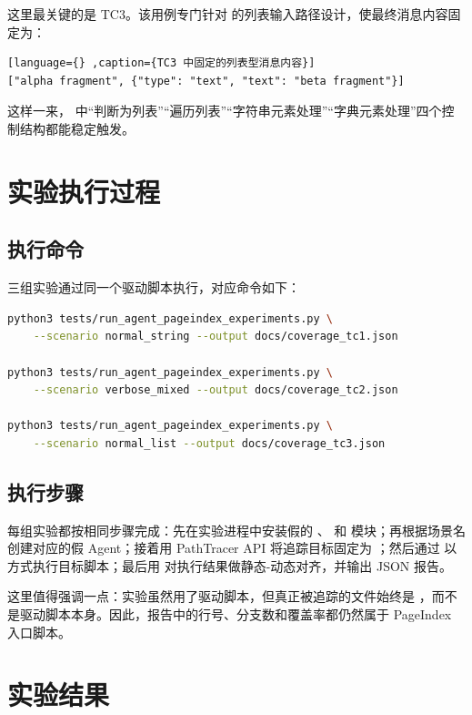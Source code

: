 这里最关键的是 TC3。该用例专门针对  的列表输入路径设计，使最终消息内容固定为：

\begin{lstlisting}[language={} ,caption={TC3 中固定的列表型消息内容}]
["alpha fragment", {"type": "text", "text": "beta fragment"}]
\end{lstlisting}

这样一来， 中“判断为列表”“遍历列表”“字符串元素处理”“字典元素处理”四个控制结构都能稳定触发。

\section{实验执行过程}

\subsection{执行命令}

三组实验通过同一个驱动脚本执行，对应命令如下：

\begin{lstlisting}[language=bash, caption={实验执行命令}]
python3 tests/run_agent_pageindex_experiments.py \
    --scenario normal_string --output docs/coverage_tc1.json

python3 tests/run_agent_pageindex_experiments.py \
    --scenario verbose_mixed --output docs/coverage_tc2.json

python3 tests/run_agent_pageindex_experiments.py \
    --scenario normal_list --output docs/coverage_tc3.json
\end{lstlisting}

\subsection{执行步骤}

每组实验都按相同步骤完成：先在实验进程中安装假的 、 和  模块；再根据场景名创建对应的假 Agent；接着用 PathTracer API 将追踪目标固定为 ；然后通过  以  方式执行目标脚本；最后用  对执行结果做静态-动态对齐，并输出 JSON 报告。

这里值得强调一点：实验虽然用了驱动脚本，但真正被追踪的文件始终是 ，而不是驱动脚本本身。因此，报告中的行号、分支数和覆盖率都仍然属于 PageIndex 入口脚本。

\section{实验结果}

